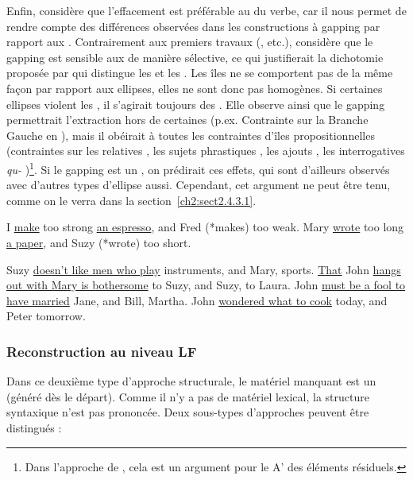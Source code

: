 Enfin, \citet{Coppock2001} considère que l’effacement est préférable au  du verbe, car il nous permet de rendre compte des différences observées dans les constructions à gapping par rapport aux . Contrairement aux premiers travaux (\citealt{Neijt1979}, etc.), \citet{Coppock2001} considère que le gapping est sensible aux  de manière sélective, ce qui justifierait la dichotomie proposée par \citet{Merchant2001} qui distingue les  et les . Les îles ne se comportent pas de la même façon par rapport aux ellipses, elles ne sont donc pas homogènes. Si certaines ellipses violent les , il s’agirait toujours des . Elle observe ainsi que le gapping permettrait l’extraction hors de certaines  (p.ex. Contrainte sur la Branche Gauche en ), mais il obéirait à toutes les contraintes d’îles propositionnelles (contraintes sur les relatives , les sujets phrastiques , les ajouts , les interrogatives \textit{qu-} )\footnote{
 Dans l’approche de \citet{Coppock2001}, cela est un argument pour le  A’ des éléments résiduels.}. Si le gapping est un , on prédirait ces effets, qui sont d’ailleurs observés avec d’autres types d’ellipse aussi. Cependant, cet argument ne peut être tenu, comme on le verra dans la section~\ref{ch2:sect2.4.3.1}.

\ea \label{ch2:ex207}
\ea I \uline{make} too strong \uline{an espresso}, and Fred (*makes) too weak.      
\ex Mary \uline{wrote} too long \uline{a paper}, and Suzy (*wrote) too short. \citep{Coppock2001}
\z
\z

\ea \label{ch2:ex208}
\ea *Suzy \uline{doesn’t like men who play} instruments, and Mary, sports. \label{ch2:ex208a}      
\ex *\uline{That} John \uline{hangs out with Mary is bothersome} to Suzy, and Suzy, to Laura. \label{ch2:ex208b}
\ex *John \uline{must be a fool to have married} Jane, and Bill, Martha. \label{ch2:ex208c}
\ex *John \uline{wondered what to cook} today, and Peter tomorrow. \citep{Coppock2001} \label{ch2:ex208d}
\z
\z


\subsubsection{Reconstruction au niveau LF} \label{ch2:sect2.4.2.2}

Dans ce deuxième type d’approche structurale, le matériel manquant est un  (généré dès le départ). Comme il n’y a pas de matériel lexical, la structure syntaxique n’est pas prononcée. Deux sous-types d’approches peuvent être distingués :

